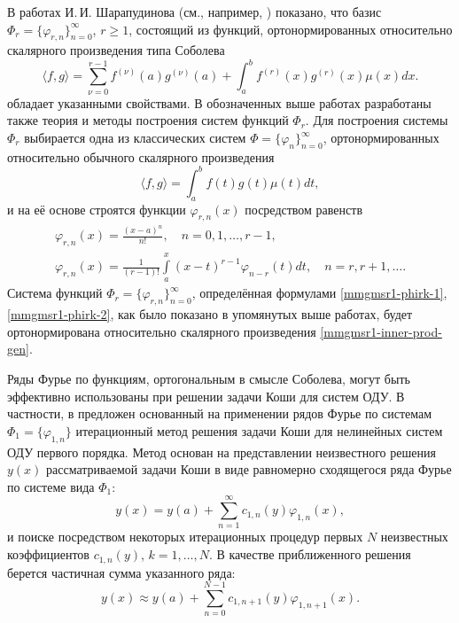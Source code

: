 В работах И.\,И. Шарапудинова (см., например, \cite{mmgmsr1-Sha18, mmgmsr1-Shii-Shti-izvvuzov2017, mmgmsr1-Shii-matzam2017, mmgmsr1-ShaGadGad16, mmgmsr1-ShaGad16, mmgmsr1-Shii-lag-demi2015, mmgmsr1-SHII-MMG-Demi2015}) показано, что базис $\Phi_r=\{\varphi_{r,n}\}_{n=0}^\infty$, $r \ge 1$, состоящий из функций, ортонормированных относительно скалярного произведения типа Соболева
\begin{equation}\label{mmgmsr1-inner-prod-gen}
\langle f,g \rangle =
\sum_{\nu=0}^{r-1}f^{(\nu)}(a)g^{(\nu)}(a)+\int_{a}^{b}f^{(r)}(x)g^{(r)}(x)\mu(x)dx.
\end{equation}
обладает указанными свойствами.
В обозначенных выше работах разработаны также теория и методы построения систем функций $\Phi_r$. Для построения системы $\Phi_r$ выбирается одна из классических систем $\Phi =\{\varphi_n\}_{n=0}^\infty$, ортонормированных относительно обычного скалярного произведения
\begin{equation}\label{mmgmsr1-classic-mul}
\langle f,g \rangle =\int_{a}^{b}f(t)g(t)\mu(t)dt,
\end{equation}
и на её основе строятся функции $\varphi_{r,n}(x)$ посредством равенств
\begin{gather}
\label{mmgmsr1-phirk-1}
\varphi_{r,n}(x) =\frac{(x-a)^n}{n!}, \quad n=0,1,\ldots, r-1,\\
\label{mmgmsr1-phirk-2}
\varphi_{r,n}(x) =\frac{1}{(r-1)!}\int\limits_{a}^x(x-t)^{r-1}\varphi_{n-r}(t)dt, \quad n=r,r+1,\ldots.
\end{gather}
Система функций $\Phi_r=\{\varphi_{r,n}\}_{n=0}^\infty$, определённая формулами \eqref{mmgmsr1-phirk-1}, \eqref{mmgmsr1-phirk-2}, как было показано в упомянутых выше работах, будет ортонормирована относительно скалярного произведения \eqref{mmgmsr1-inner-prod-gen}.

Ряды Фурье по функциям, ортогональным в смысле Соболева, могут быть эффективно использованы при решении задачи Коши для систем ОДУ. В частности, в \cite{mmgmsr1-ShaOdeDemi2017,mmgmsr1-ShaMagOdeCos2017,mmgmsr1-SMS-SHTI-Demi2017,mmgmsr1-SHII-MSR-Demi2017} предложен основанный на применении рядов Фурье по системам $\Phi_1=\{\varphi_{1,n}\}$ итерационный метод решения задачи Коши для нелинейных систем ОДУ первого порядка. Метод основан на представлении неизвестного решения $y(x)$ рассматриваемой задачи Коши в виде равномерно сходящегося ряда Фурье по системе вида $\Phi_1$:
\begin{equation*}
y(x) = y(a)+\sum\limits_{n=1}^{\infty}
c_{1,n}(y)\varphi_{1,n}(x),
\end{equation*}
и поиске посредством некоторых итерационных процедур первых $N$ неизвестных коэффициентов $c_{1,n}(y)$, $k=1,\ldots,N$. В качестве приближенного решения берется частичная сумма указанного ряда:
\begin{equation}\label{mmgmsr1-y-part-sum}
y(x) \approx y(a)+\sum\limits_{n=0}^{N-1}
c_{1,n+1}(y)\varphi_{1,n+1}(x).
\end{equation}

